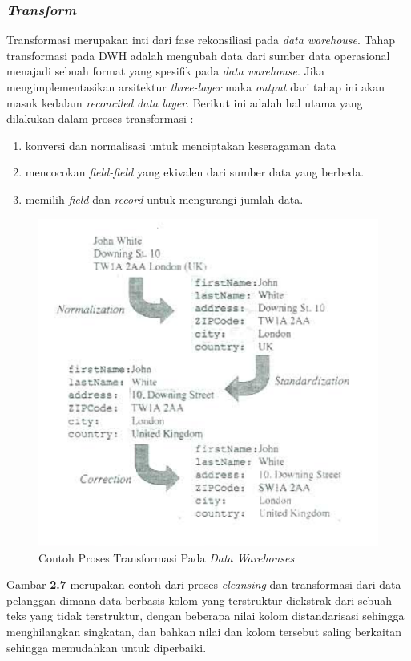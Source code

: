 \subsubsection{\textit{Transform}} 
Transformasi merupakan inti dari fase rekonsiliasi pada \textit{data warehouse}. Tahap transformasi pada DWH adalah mengubah data dari sumber data operasional menajadi sebuah format yang spesifik pada \textit{data warehouse}. Jika mengimplementasikan arsitektur \textit{three-layer} maka \textit{output} dari tahap ini akan masuk kedalam \textit{reconciled data layer}. Berikut ini adalah hal utama yang dilakukan dalam proses transformasi \cite{Matteo:2009}:

\begin{enumerate}
	\item konversi dan normalisasi untuk menciptakan keseragaman data
	\item mencocokan \textit{field-field} yang ekivalen dari sumber data yang berbeda.
	\item memilih \textit{field} dan \textit{record} untuk mengurangi jumlah data.
\end{enumerate} 
\begin{figure}[h]
	\centering
	\includegraphics[scale=0.85]{Gambar/transformation}
	\caption{Contoh Proses Transformasi Pada \textit{Data Warehouses}\cite{Matteo:2009}}
	\end{figure} 
Gambar \textbf{2.7} merupakan contoh dari proses \textit{cleansing} dan transformasi dari data pelanggan dimana data berbasis kolom yang terstruktur diekstrak dari sebuah teks yang tidak terstruktur, dengan beberapa nilai kolom distandarisasi sehingga menghilangkan singkatan, dan bahkan nilai dan kolom tersebut saling berkaitan sehingga memudahkan untuk diperbaiki\cite{Matteo:2009}.

